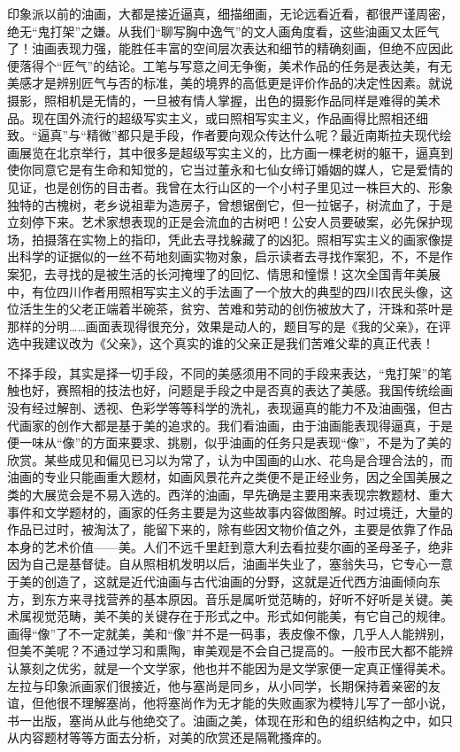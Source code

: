 \documentclass{article}
\begin{document}
印象派以前的油画，大都是接近逼真，细描细画，无论远看近看，都很严谨周密，绝无“鬼打架”之嫌。从我们“聊写胸中逸气”的文人画角度看，这些油画又太匠气了！油画表现力强，能胜任丰富的空间层次表达和细节的精确刻画，但绝不应因此便落得个“匠气”的结论。工笔与写意之间无争衡，美术作品的任务是表达美，有无美感才是辨别匠气与否的标准，美的境界的高低更是评价作品的决定性因素。就说摄影，照相机是无情的，一旦被有情人掌握，出色的摄影作品同样是难得的美术品。现在国外流行的超级写实主义，或曰照相写实主义，作品画得比照相还细致。“逼真”与“精微”都只是手段，作者要向观众传达什么呢？最近南斯拉夫现代绘画展览在北京举行，其中很多是超级写实主义的，比方画一棵老树的躯干，逼真到使你同意它是有生命和知觉的，它当过董永和七仙女缔订婚姻的媒人，它是爱情的见证，也是创伤的目击者。我曾在太行山区的一个小村子里见过一株巨大的、形象独特的古槐树，老乡说祖辈为造房子，曾想锯倒它，但一拉锯子，树流血了，于是立刻停下来。艺术家想表现的正是会流血的古树吧！公安人员要破案，必先保护现场，拍摄落在实物上的指印，凭此去寻找躲藏了的凶犯。照相写实主义的画家像提出科学的证据似的一丝不苟地刻画实物对象，启示读者去寻找作案犯，不，不是作案犯，去寻找的是被生活的长河掩埋了的回忆、情思和憧憬！这次全国青年美展中，有位四川作者用照相写实主义的手法画了一个放大的典型的四川农民头像，这位活生生的父老正端着半碗茶，贫穷、苦难和劳动的创伤被放大了，汗珠和茶叶是那样的分明……画面表现得很充分，效果是动人的，题目写的是《我的父亲》，在评选中我建议改为《父亲》，这个真实的谁的父亲正是我们苦难父辈的真正代表！

不择手段，其实是择一切手段，不同的美感须用不同的手段来表达，“鬼打架”的笔触也好，赛照相的技法也好，问题是手段之中是否真的表达了美感。我国传统绘画没有经过解剖、透视、色彩学等等科学的洗礼，表现逼真的能力不及油画强，但古代画家的创作大都是基于美的追求的。我们看油画，由于油画能表现得逼真，于是便一味从“像”的方面来要求、挑剔，似乎油画的任务只是表现“像”，不是为了美的欣赏。某些成见和偏见已习以为常了，认为中国画的山水、花鸟是合理合法的，而油画的专业只能画重大题材，如画风景花卉之类便不是正经业务，因之全国美展之类的大展览会是不易入选的。西洋的油画，早先确是主要用来表现宗教题材、重大事件和文学题材的，画家的任务主要是为这些故事内容做图解。时过境迁，大量的作品已过时，被淘汰了，能留下来的，除有些因文物价值之外，主要是依靠了作品本身的艺术价值——美。人们不远千里赶到意大利去看拉斐尔画的圣母圣子，绝非因为自己是基督徒。自从照相机发明以后，油画半失业了，塞翁失马，它专心一意于美的创造了，这就是近代油画与古代油画的分野，这就是近代西方油画倾向东方，到东方来寻找营养的基本原因。音乐是属听觉范畴的，好听不好听是关键。美术属视觉范畴，美不美的关键存在于形式之中。形式如何能美，有它自己的规律。画得“像”了不一定就美，美和“像”并不是一码事，表皮像不像，几乎人人能辨别，但美不美呢？不通过学习和熏陶，审美观是不会自己提高的。一般市民大都不能辨认篆刻之优劣，就是一个文学家，他也并不能因为是文学家便一定真正懂得美术。左拉与印象派画家们很接近，他与塞尚是同乡，从小同学，长期保持着亲密的友谊，但他很不理解塞尚，他将塞尚作为无才能的失败画家为模特儿写了一部小说，书一出版，塞尚从此与他绝交了。油画之美，体现在形和色的组织结构之中，如只从内容题材等等方面去分析，对美的欣赏还是隔靴搔痒的。
\end{document}
